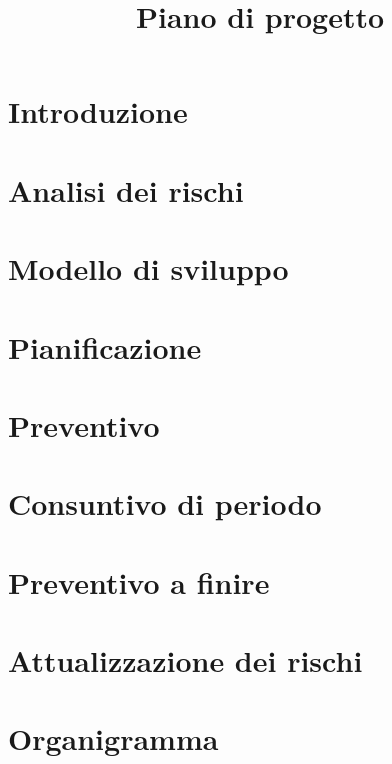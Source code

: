 \documentclass{article}
\title{Piano di progetto}
\begin{document}


\section{Introduzione}%
\label{sec:introduzione}

\newpage
\section{Analisi dei rischi}%
\label{sec:analisi_dei_rischi}

\newpage
\section{Modello di sviluppo}%
\label{sec:modello_di_sviluppo}

\newpage
\section{Pianificazione}%
\label{sec:pianificazione}

\newpage
\section{Preventivo}%
\label{sec:preventivo}

\newpage
\section{Consuntivo di periodo}%
\label{sec:consuntivo_di_periodo}

\section{Preventivo a finire}%
\label{sec:preventivo_a_finire}

\newpage
\appendix
\section{Attualizzazione dei rischi}%
\label{sec:attualizzazione_dei_rischi}

\newpage
\section{Organigramma}%
\label{sec:organigramma}

\end{document}
